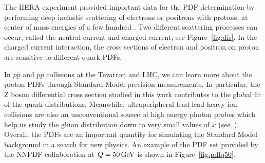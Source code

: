 The HERA experiment provided important data for the PDF determination by performing
deep inelastic scattering of electrons or positrons with protons, 
at center of mass energies of a few hundred \GeV.
Two different scattering processes can occur, called the neutral current and charged current; see Figure~\ref{fig:dis}.
In the charged current interaction, the cross sections of electron and positron on proton are sensitive to different quark PDFs.
%

In $p\bar{p}$ and $pp$ collisions at the Tevatron and LHC,
we can learn more about the proton PDFs through Standard Model precision measurements.
In particular, the Z boson differential cross section studied in this work contributes to the global fit of the quark distributions.
Meanwhile, ultraperipheral lead-lead heavy ion collisions are also an unconventional source of high energy photon probes which help us study the gluon distribution down to very small values of $x$ (see~\cite{Baltz:2007kq}).
Overall, the PDFs are an important quantity for simulating the Standard Model background in a search for new physics.
An example of the PDF set provided by the NNPDF collaboration at $Q=50 \,\text{Ge\hspace{-.08em}V}$ is shown in Figure~\ref{fig:pdfq50}.

